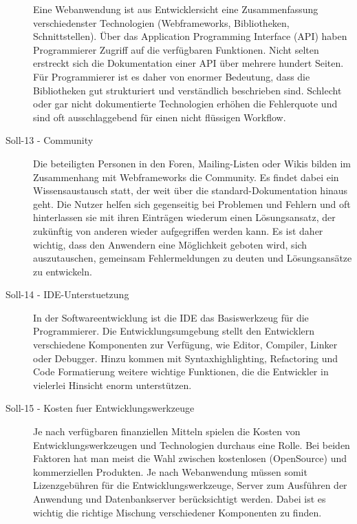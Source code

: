\begin{description}
    Eine Webanwendung ist aus Entwicklersicht eine Zusammenfassung
    verschiedenster Technologien (Webframeworks, Bibliotheken, Schnittstellen).
    Über das Application Programming Interface (API) haben Programmierer Zugriff
    auf die verfügbaren Funktionen. Nicht selten erstreckt sich die
    Dokumentation einer API über mehrere hundert Seiten. Für Programmierer ist
    es daher von enormer Bedeutung, dass die Bibliotheken gut strukturiert und
    verständlich beschrieben sind. Schlecht oder gar nicht dokumentierte
    Technologien erhöhen die Fehlerquote und sind oft ausschlaggebend für einen
    nicht flüssigen Workflow.

    \item[Soll-13 - Community\label{itm:Soll-13}]

    Die beteiligten Personen in den Foren, Mailing-Listen oder Wikis bilden im
    Zusammenhang mit Webframeworks die Community. Es findet dabei ein
    Wissensaustausch statt, der weit über die standard-Dokumentation hinaus
    geht. Die Nutzer helfen sich gegenseitig bei Problemen und Fehlern und oft
    hinterlassen sie mit ihren Einträgen wiederum einen Lösungsansatz, der
    zukünftig von anderen wieder aufgegriffen werden kann. Es ist daher 
    wichtig, dass den Anwendern eine Möglichkeit geboten wird, sich
    auszutauschen, gemeinsam Fehlermeldungen zu deuten und Lösungsansätze zu
    entwickeln.

    \item[Soll-14 - IDE-Unterstuetzung\label{itm:Soll-14}]

    In der Softwareentwicklung ist die IDE das Basiswerkzeug für die
    Programmierer. Die Entwicklungsumgebung stellt den Entwicklern verschiedene
    Komponenten zur Verfügung, wie Editor, Compiler, Linker oder Debugger.
    Hinzu kommen mit Syntaxhighlighting, Refactoring und Code Formatierung
    weitere wichtige Funktionen, die die Entwickler in vielerlei Hinsicht enorm
    unterstützen.

    \item[Soll-15 - Kosten fuer Entwicklungswerkzeuge\label{itm:Soll-15}]

    Je nach verfügbaren finanziellen Mitteln spielen die Kosten von
    Entwicklungswerkzeugen und Technologien durchaus eine Rolle. Bei beiden
    Faktoren hat man meist die Wahl zwischen kostenlosen (OpenSource) und
    kommerziellen Produkten. Je nach Webanwendung müssen somit Lizenzgebühren
    für die Entwicklungswerkzeuge, Server zum Ausführen der Anwendung und
    Datenbankserver berücksichtigt werden. Dabei ist es wichtig die richtige
    Mischung verschiedener Komponenten zu finden.
  

\end{description}
